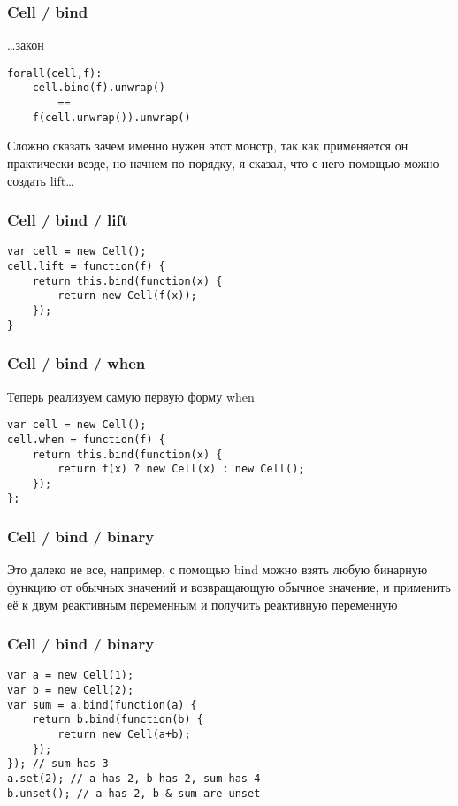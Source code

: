 \documentclass[xetex]{beamer}
\begin{document}
\begin{frame}[fragile]
\frametitle{Cell / bind}
\dots{}закон

\vspace{6mm}
\begin{lstlisting}
forall(cell,f):
    cell.bind(f).unwrap() 
        == 
    f(cell.unwrap()).unwrap()
\end{lstlisting}
\vspace{6mm}

Сложно сказать зачем именно нужен этот монстр, так как применяется он практически везде, но начнем по порядку, я сказал, что с него помощью можно создать lift\dots
\end{frame}


\begin{frame}[fragile]
\frametitle{Cell / bind / lift}
\begin{lstlisting}
var cell = new Cell();
cell.lift = function(f) {
    return this.bind(function(x) {
        return new Cell(f(x));
    });
}
\end{lstlisting}
\end{frame}


\begin{frame}[fragile]
\frametitle{Cell / bind / when}
Теперь реализуем самую первую форму when
\vspace{10mm}
\begin{lstlisting}
var cell = new Cell();
cell.when = function(f) {
    return this.bind(function(x) {
        return f(x) ? new Cell(x) : new Cell();
    });
};
\end{lstlisting}
\end{frame}


\begin{frame}[fragile]
\frametitle{Cell / bind / binary}
Это далеко не все, например, с помощью bind можно взять любую бинарную функцию от обычных значений и возвращающую обычное значение, и применить её к двум реактивным переменным и получить реактивную переменную
\end{frame}


\begin{frame}[fragile]
\frametitle{Cell / bind / binary}
\begin{lstlisting}
var a = new Cell(1);
var b = new Cell(2);
var sum = a.bind(function(a) {
    return b.bind(function(b) {
        return new Cell(a+b);
    });
}); // sum has 3
a.set(2); // a has 2, b has 2, sum has 4
b.unset(); // a has 2, b & sum are unset
\end{lstlisting}
\end{frame}
\end{document}
